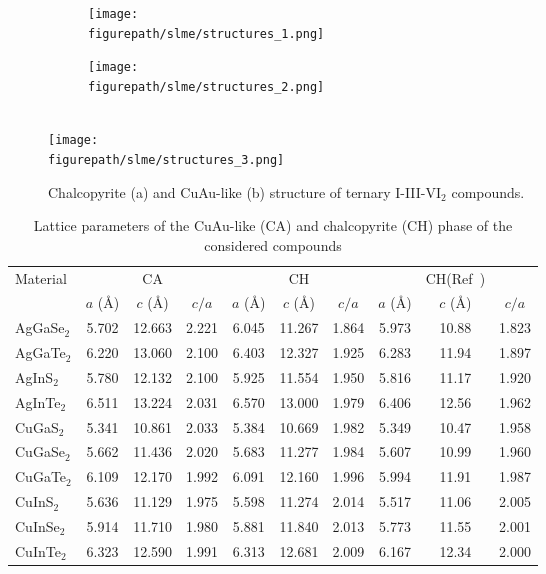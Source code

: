 \begin{refsection}
\begin{figure}[ht]  
\setlength{\captionmargin}{10pt} 
\centering 
\begin{subfigure}{0.24\textwidth} 
\centering 
\texttt{[image: \\figurepath/slme/structures\_1.png]} 
\caption{} 
\end{subfigure}%
\begin{subfigure}{0.24\textwidth} 
\centering 
\texttt{[image: \\figurepath/slme/structures\_2.png]} 
\caption{} 
\end{subfigure} 
\vspace{0.7em}\\ 
\texttt{[image: \\figurepath/slme/structures\_3.png]} 
\caption{\label{slme:fig-CuAu_structure} Chalcopyrite (a) and CuAu-like (b) 
structure of ternary \mbox{I-III-VI$_2$} compounds.} 
\end{figure} 
 
\begin{table}[ht] 
\centering 
\renewcommand{\arraystretch}{1.3} 
\caption{Lattice parameters of the \mbox{CuAu-like} (CA) and chalcopyrite (CH) 
phase of the considered compounds} 
\label{slme:tab-lattice} 
\begin{tabular*}{\textwidth}{@{\extracolsep{\fill}}lccccccccc}\hline 
\multirow{2}{*}{Material}    & & CA & & & CH & & & CH(Ref~\cite{Hahn1953}) & 
\\ \cmidrule(lr){2-4} \cmidrule(lr){5-7} \cmidrule(lr){8-10} 
 			&  $a$ (\si{\angstrom}) & $c$ (\si{\angstrom}) & $c/a$ & $a$ 
(\si{\angstrom}) & $c$ (\si{\angstrom}) & $c/a$ & $a$ (\si{\angstrom}) & $c$ 
(\si{\angstrom}) & $c/a$ \\\hline 
AgGaSe$_2$ 	& 5.702 & 12.663 & 2.221 & 6.045 & 11.267 & 1.864 & 5.973 & 10.88 
& 1.823 \\ 
AgGaTe$_2$ 	& 6.220 & 13.060 & 2.100 & 6.403 & 12.327 & 1.925 & 6.283 & 11.94 
& 1.897 \\ 
AgInS$_2$  	& 5.780 & 12.132 & 2.100 & 5.925 & 11.554 & 1.950 & 5.816 & 11.17 
& 1.920 \\ 
AgInTe$_2$ 	& 6.511 & 13.224 & 2.031 & 6.570 & 13.000 & 1.979 & 6.406 & 12.56 
& 1.962 \\ 
CuGaS$_2$  	& 5.341 & 10.861 & 2.033 & 5.384 & 10.669 & 1.982 & 5.349 & 10.47 
& 1.958 \\ 
CuGaSe$_2$ 	& 5.662 & 11.436 & 2.020 & 5.683 & 11.277 & 1.984 & 5.607 & 10.99 
& 1.960 \\ 
CuGaTe$_2$ 	& 6.109 & 12.170 & 1.992 & 6.091 & 12.160 & 1.996 & 5.994 & 11.91 
& 1.987 \\ 
CuInS$_2$ 	& 5.636 & 11.129 & 1.975 & 5.598 & 11.274 & 2.014 & 5.517 & 11.06 & 
2.005 \\ 
CuInSe$_2$ 	& 5.914 & 11.710 & 1.980 & 5.881 & 11.840 & 2.013 & 5.773 & 11.55 
& 2.001 \\ 
CuInTe$_2$ 	& 6.323 & 12.590 & 1.991 & 6.313 & 12.681 & 2.009 & 6.167 & 12.34 
& 2.000 \\ \hline 
\end{tabular*} 
\end{table} 


\end{refsection}
